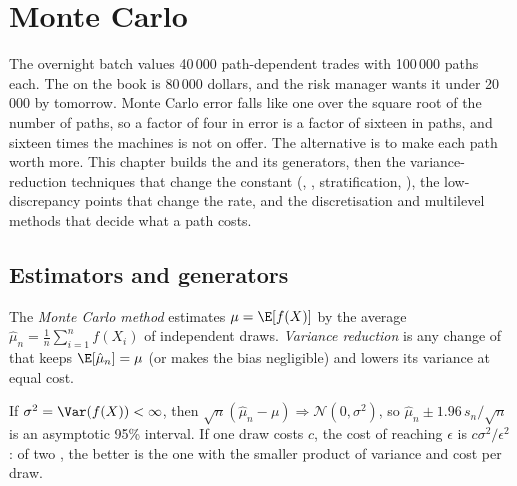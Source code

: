 \chapter{Monte Carlo}\label{ch:qm:monte-carlo}

The overnight batch values 40\,000 path-dependent trades with 100\,000 paths each. The  on the book is 80\,000 dollars, and the risk manager wants it under 20\,000 by tomorrow.
Monte Carlo error falls like one over the square root of the number of paths, so a factor of four in error is a factor of sixteen in paths, and sixteen times the machines is not on offer. The
alternative is to make each path worth more. This chapter builds the  and its generators, then the variance-reduction techniques that change the constant (,
, stratification, ), the low-discrepancy points that change the rate, and the discretisation and multilevel methods that decide what a path costs.

\section{Estimators and generators}

\begin{definition}\label{def:qm:monte-carlo:mc}
The \emph{Monte Carlo method} estimates $\mu = \E[f(X)]$ by the average $\hat\mu_n = \frac1n\sum_{i=1}^nf(X_i)$ of independent draws. \emph{Variance
reduction} is any change of  that keeps $\E[\hat\mu_n] = \mu$ (or makes the bias negligible) and lowers its variance at equal cost.
\end{definition}

\begin{proposition}\label{prop:qm:monte-carlo:clt}
If $\sigma^2 = \Var(f(X)) < \infty$, then $\sqrt n(\hat\mu_n - \mu) \Rightarrow \mathcal N(0, \sigma^2)$, so $\hat\mu_n \pm 1.96\,s_n/\sqrt n$ is an asymptotic 95\% interval. If one draw costs $c$, the
cost of reaching  $\epsilon$ is $c\sigma^2/\epsilon^2$: of two , the better is the one with the smaller product of variance and cost per draw.
\end{proposition}

